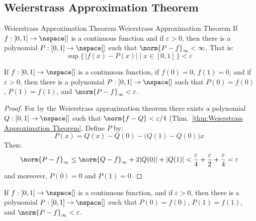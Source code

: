     \subsection{Weierstrass Approximation Theorem}
        \begin{ftheorem}{Weierstrass Approximation Theorem}
                        {Weierstrass Approximation Theorem}
            If $f:[0,1]\rightarrow\nspace[]$ is a continuous function and if
            $\varepsilon>0$, then there is a polynomial
            $P:[0,1]\rightarrow\nspace[]$ such that
            $\norm{P-f}_{\infty}<\infty$. That is:
            \begin{equation*}
                \sup\big\{\,|f(x)-P(x)|\;\big|\;x\in[0,1]\,\big\}<\varepsilon
            \end{equation*}
        \end{ftheorem}
        \begin{theorem}
            \label{thm:Weierstrass_Approx_Endpoints_Eq_Zero}%
            If $f:[0,1]\rightarrow\nspace[]$ is a continuous function, if
            $f(0)=0$, $f(1)=0$, and if $\varepsilon>0$, then there is a
            polynomial $P:[0,1]\rightarrow\nspace[]$ such that $P(0)=f(0)$,
            $P(1)=f(1)$, and $\norm{P-f}_{\infty}<\varepsilon$.
        \end{theorem}
        \begin{proof}
            For by the Weierstrass approximation theorem there exists a
            polynomial $Q:[0,1]\rightarrow\nspace[]$ such that
            $\norm{f-Q}<\varepsilon/4$
            (Thm.~\ref{thm:Weierstrass Approximation Theorem}. Define $P$ by:
            \begin{equation}
                P(x)=Q(x)-Q(0)-\big(Q(1)-Q(0)\big)x
            \end{equation}
            Then:
            \begin{equation}
                \norm{P-f}_{\infty}\leq
                \norm{Q-f}_{\infty}+2|Q(0)|+|Q(1)|
                <\frac{\varepsilon}{4}+\frac{\varepsilon}{2}
                    +\frac{\varepsilon}{4}=\varepsilon
            \end{equation}
            and moreover, $P(0)=0$ and $P(1)=0$.
        \end{proof}
        \begin{theorem}
            \label{thm:Weierstrass_Fixed_Endpoints}%
            If $f:[0,1]\rightarrow\nspace[]$ is a continuous function, and if
            $\varepsilon>0$, then there is a polynomial
            $P:[0,1]\rightarrow\nspace[]$ such that $P(0)=f(0)$, $P(1)=f(1)$,
            and $\norm{P-f}_{\infty}<\varepsilon$.
        \end{theorem}
